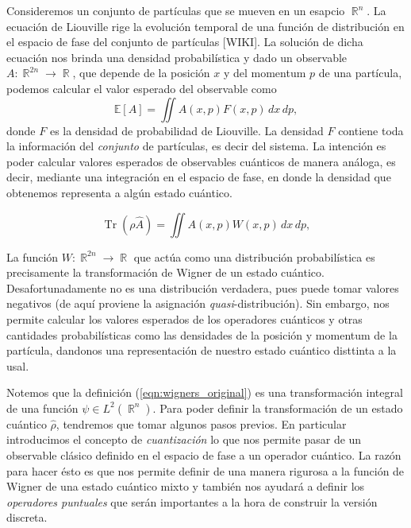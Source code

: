\documentclass[a4paper]{report}
\DeclareMathOperator{\R}{\mathbb{R}}
\DeclareMathOperator{\Tr}{Tr}
\begin{document}
  Consideremos un conjunto de partículas que se mueven en un
  esapcio $\R^{n}$. La ecuación de Liouville rige la
  evolución temporal de una función de distribución en el
  espacio de fase del conjunto de partículas [WIKI]. La
  solución de dicha ecuación nos brinda una densidad
  probabilística y dado un observable $A : \R^{2n} \to \R$,
  que depende de la posición $x$ y del momentum $p$ de una
  partícula, podemos calcular el valor esperado del
  observable como
  \begin{equation}
    \mathbb E[A]
    = \iint A(x,p) F(x,p) \, dx \, dp,
  \end{equation}
  donde $F$ es la densidad de probabilidad de Liouville. La
  densidad $F$ contiene toda la información del
  \textit{conjunto} de partículas, es decir del sistema. La
  intención es poder calcular valores esperados de
  observables cuánticos de manera análoga, es decir,
  mediante una integración en el espacio de fase, en donde
  la densidad que obtenemos representa a algún estado
  cuántico.

  \begin{equation}
    \Tr\left(\rho \hat{A}\right)
    = \iint A(x,p)W(x,p) \, dx \, dp,
  \end{equation}

  La función $W : \R^{2n} \to \R$ que actúa como una
  distribución probabilística es precisamente la
  transformación de Wigner de un estado cuántico.
  Desafortunadamente no es una distribución verdadera, pues
  puede tomar valores negativos (de aquí proviene la
  asignación \textit{quasi}-distribución). Sin embargo, nos
  permite calcular los valores esperados de los operadores
  cuánticos y otras cantidades probabilísticas como las
  densidades de la posición y momentum de la partícula,
  dandonos una representación de nuestro estado cuántico
  disttinta a la usal.

  Notemos que la definición (\ref{eqn:wigners_original}) es
  una transformación integral de una función $\psi \in
  L^2(\R^{n})$. Para poder definir la transformación de un
  estado cuántico $\hat{\rho}$, tendremos que tomar algunos
  pasos previos. En particular introducimos el concepto de
  \textit{cuantización} lo que nos permite pasar de un
  observable clásico definido en el espacio de fase a un
  operador cuántico. La razón para hacer ésto es que nos
  permite definir de una manera rigurosa a la función de
  Wigner de una estado cuántico mixto y también nos ayudará
  a definir los \textit{operadores puntuales} que serán
  importantes a la hora de construir la versión discreta.
\end{document}
